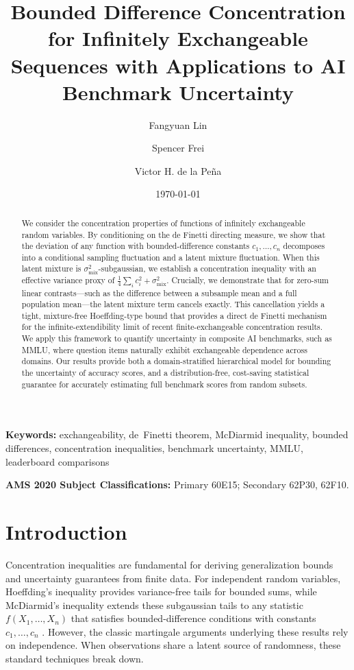 \documentclass[11pt]{article}
\title{\bf
Bounded Difference Concentration for Infinitely Exchangeable Sequences with Applications to AI Benchmark Uncertainty}
\author[1]{Fangyuan Lin}
\author[2]{Spencer Frei}
\author[1]{Victor H. de la Pe\~{n}a}
\affil[1]{Department of Statistics, Columbia University}
\affil[2]{Google DeepMind}
\affil[ ]{\texttt{fl2744@columbia.edu}, \texttt{sfrei@google.com}, \texttt{vhd1@columbia.edu}}
\date{\today}
\theoremstyle{definition}
\theoremstyle{remark}
\begin{document}
\maketitle

\begin{abstract}
We consider the concentration properties of functions of infinitely exchangeable random variables. By conditioning on the de Finetti directing measure, we show that the deviation of any function with bounded-difference constants $c_1, \dots, c_n$ decomposes into a conditional sampling fluctuation and a latent mixture fluctuation.  When this latent mixture is $\sigma_{\mathrm{mix}}^2$-subgaussian, we establish a concentration inequality with an effective variance proxy of $\frac{1}{4}\sum_i c_i^2 + \sigma_{\mathrm{mix}}^2$. Crucially, we demonstrate that for zero-sum linear contrasts—such as the difference between a subsample mean and a full population mean—the latent mixture term cancels exactly. This cancellation yields a tight, mixture-free Hoeffding-type bound that provides a direct de Finetti mechanism for the infinite-extendibility limit of recent finite-exchangeable concentration results. We apply this framework to quantify uncertainty in composite AI benchmarks, such as MMLU, where question items naturally exhibit exchangeable dependence across domains. Our results provide both a domain-stratified hierarchical model for bounding the uncertainty of accuracy scores, and a distribution-free, cost-saving statistical guarantee for accurately estimating full benchmark scores from random subsets.
\end{abstract}


\medskip
\noindent\textbf{Keywords:} exchangeability, de~Finetti theorem, McDiarmid inequality, bounded differences, concentration inequalities, benchmark uncertainty, MMLU, leaderboard comparisons

\medskip
\noindent\textbf{AMS 2020 Subject Classifications:} Primary 60E15; Secondary 62P30, 62F10.

\tableofcontents

\section{Introduction}\label{sec:intro}
Concentration inequalities are fundamental for deriving generalization bounds and uncertainty guarantees from finite data. For independent random variables, Hoeffding's inequality provides variance-free tails for bounded sums, while McDiarmid's inequality extends these subgaussian tails to any statistic $f(X_1,\dots, X_n)$ that satisfies bounded-difference conditions with constants $c_1, \dots, c_n$ \citep{hoeffding1963probability,mcdiarmid1989method}. However, the classic martingale arguments underlying these results rely on independence. When observations share a latent source of randomness, these standard techniques break down.
\end{document}
